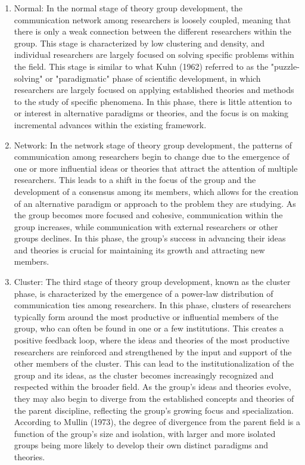 \begin{enumerate}

\item Normal: In the normal stage of theory group development, the communication network among researchers is loosely coupled, meaning that there is only a weak connection between the different researchers within the group. This stage is characterized by low clustering and density, and individual researchers are largely focused on solving specific problems within the field. This stage is similar to what Kuhn (1962) referred to as the "puzzle-solving" or "paradigmatic" phase of scientific development, in which researchers are largely focused on applying established theories and methods to the study of specific phenomena. In this phase, there is little attention to or interest in alternative paradigms or theories, and the focus is on making incremental advances within the existing framework.

\item Network: In the network stage of theory group development, the patterns of communication among researchers begin to change due to the emergence of one or more influential ideas or theories that attract the attention of multiple researchers. This leads to a shift in the focus of the group and the development of a consensus among its members, which allows for the creation of an alternative paradigm or approach to the problem they are studying. As the group becomes more focused and cohesive, communication within the group increases, while communication with external researchers or other groups declines. In this phase, the group's success in advancing their ideas and theories is crucial for maintaining its growth and attracting new members.

\item Cluster: The third stage of theory group development, known as the cluster phase, is characterized by the emergence of a power-law distribution of communication ties among researchers. In this phase, clusters of researchers typically form around the most productive or influential members of the group, who can often be found in one or a few institutions. This creates a positive feedback loop, where the ideas and theories of the most productive researchers are reinforced and strengthened by the input and support of the other members of the cluster. This can lead to the institutionalization of the group and its ideas, as the cluster becomes increasingly recognized and respected within the broader field. As the group's ideas and theories evolve, they may also begin to diverge from the established concepts and theories of the parent discipline, reflecting the group's growing focus and specialization. According to Mullin (1973), the degree of divergence from the parent field is a function of the group's size and isolation, with larger and more isolated groups being more likely to develop their own distinct paradigms and theories. 


\end{enumerate}
